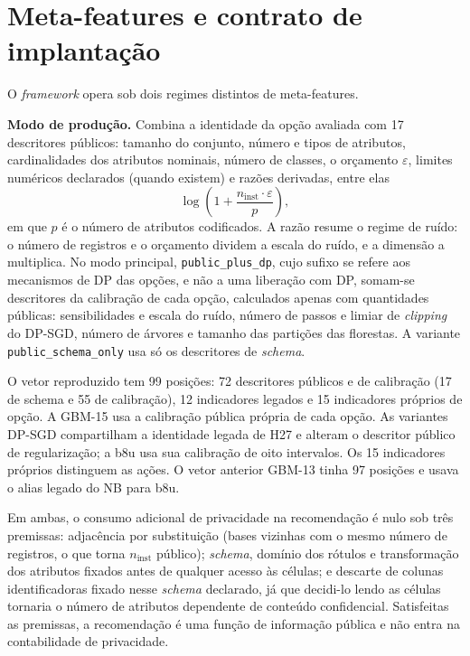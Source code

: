 \section{Meta-features e contrato de implantação}
\label{sec:meta-features}

O \textit{framework} opera sob dois regimes distintos de meta-features.

\textbf{Modo de produção.} Combina a identidade da opção avaliada com 17 descritores públicos: tamanho do conjunto, número e tipos de atributos, cardinalidades dos atributos nominais, número de classes, o orçamento $\varepsilon$, limites numéricos declarados (quando existem) e razões derivadas, entre elas
\begin{equation}
    \log\left(1 + \frac{n_{\text{inst}} \cdot \varepsilon}{p}\right),
    \label{eq:n-eps-p}
\end{equation}
em que $p$ é o número de atributos codificados. A razão resume o regime de ruído: o número de registros e o orçamento dividem a escala do ruído, e a dimensão a multiplica. No modo principal, \texttt{public\_plus\_dp}, cujo sufixo se refere aos mecanismos de DP das opções, e não a uma liberação com DP, somam-se descritores da calibração de cada opção, calculados apenas com quantidades públicas: sensibilidades e escala do ruído, número de passos e limiar de \textit{clipping} do DP-SGD, número de árvores e tamanho das partições das florestas. A variante \texttt{public\_schema\_only} usa só os descritores de \textit{schema}.

O vetor reproduzido tem 99 posições: 72 descritores públicos e de calibração (17 de schema e 55 de calibração), 12 indicadores legados e 15 indicadores próprios de opção. A GBM-15 usa a calibração pública própria de cada opção. As variantes DP-SGD compartilham a identidade legada de H27 e alteram o descritor público de regularização; a b8u usa sua calibração de oito intervalos. Os 15 indicadores próprios distinguem as ações. O vetor anterior GBM-13 tinha 97 posições e usava o alias legado do NB para b8u.

Em ambas, o consumo adicional de privacidade na recomendação é nulo sob três premissas: adjacência por substituição (bases vizinhas com o mesmo número de registros, o que torna $n_{\text{inst}}$ público); \textit{schema}, domínio dos rótulos e transformação dos atributos fixados antes de qualquer acesso às células; e descarte de colunas identificadoras fixado nesse \textit{schema} declarado, já que decidi-lo lendo as células tornaria o número de atributos dependente de conteúdo confidencial. Satisfeitas as premissas, a recomendação é uma função de informação pública e não entra na contabilidade de privacidade.

